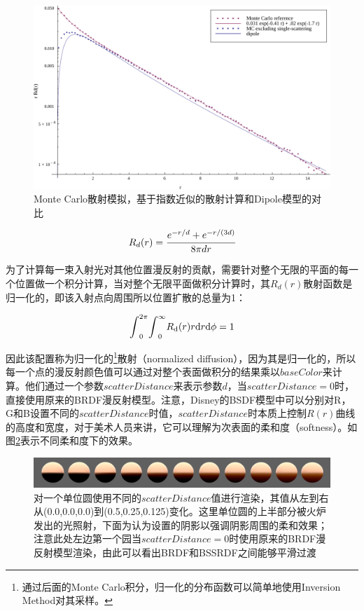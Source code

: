 \begin{figure}
	\includegraphics[width=1.\textwidth]{figures/intro/monteCarloFit}
	\caption{Monte Carlo散射模拟，基于指数近似的散射计算和Dipole模型的对比}
	\label{f:intro-bssrdf-r}
\end{figure}

\begin{equation}
	R_d(r)= \cfrac{e^{-r/d}+e^{-r/(3d)}}{8\pi dr}
\end{equation}

\noindent 为了计算每一束入射光对其他位置漫反射的贡献，需要针对整个无限的平面的每一个位置做一个积分计算，当对整个无限平面做积分计算时，其$R_d(r)$散射函数是归一化的，即该入射点向周围所以位置扩散的总量为1：

\begin{equation}
	{\rm \int}^{2\pi}_0{\rm \int}^\infty_0 R_{\rm d}(r)r{\rm d}r{\rm d}\phi=1
\end{equation}

\noindent 因此该配置称为归一化的\footnote{通过后面的Monte Carlo积分，归一化的分布函数可以简单地使用Inversion Method对其采样。}散射（normalized diffusion），因为其是归一化的，所以每一个点的漫反射颜色值可以通过对整个表面做积分的结果乘以$baseColor$来计算。他们通过一个参数$scatterDistance$来表示参数$d$，当$scatterDistance=0$时，直接使用原来的BRDF漫反射模型。注意，Disney的BSDF模型中可以分别对R，G和B设置不同的$scatterDistance$时值，$scatterDistance$时本质上控制$R(r)$曲线的高度和宽度，对于美术人员来讲，它可以理解为次表面的柔和度（softness）。如图\ref{f:intro-bssrdf-sss}表示不同柔和度下的效果。

\begin{figure}
\begin{fullwidth}
	\includegraphics[width=1.\thewidth]{figures/intro/spheres-SSS}
	\caption{对一个单位圆使用不同的$scatterDistance$值进行渲染，其值从左到右从(0.0,0.0,0.0)到(0.5,0.25,0.125)变化。这里单位圆的上半部分被火炉发出的光照射，下面为认为设置的阴影以强调阴影周围的柔和效果；注意此处左边第一个园当$scatterDistance=0$时使用原来的BRDF漫反射模型渲染，由此可以看出BRDF和BSSRDF之间能够平滑过渡}
	\label{f:intro-bssrdf-sss}
\end{fullwidth}
\end{figure}

